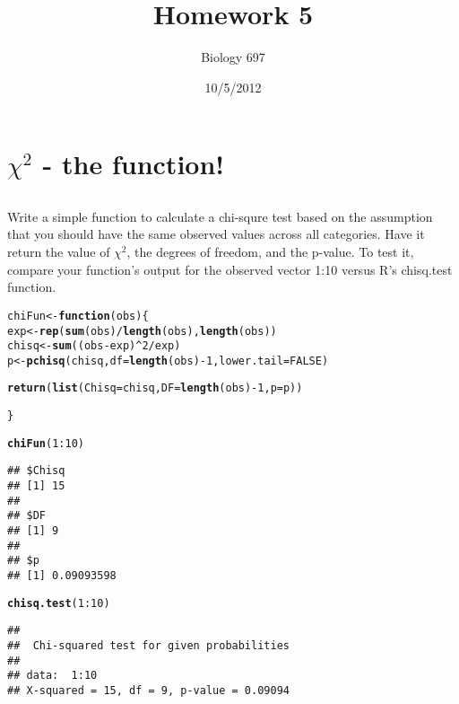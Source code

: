 \documentclass{article}\usepackage[]{graphicx}\usepackage[]{color}
\makeatletter
\newcommand{\hlnum}[1]{\textcolor[rgb]{0.686,0.059,0.569}{#1}}%
\newcommand{\hlopt}[1]{\textcolor[rgb]{0,0,0}{#1}}%
\newcommand{\hlstd}[1]{\textcolor[rgb]{0.345,0.345,0.345}{#1}}%
\newcommand{\hlkwa}[1]{\textcolor[rgb]{0.161,0.373,0.58}{\textbf{#1}}}%
\newcommand{\hlkwb}[1]{\textcolor[rgb]{0.69,0.353,0.396}{#1}}%
\newcommand{\hlkwc}[1]{\textcolor[rgb]{0.333,0.667,0.333}{#1}}%
\newcommand{\hlkwd}[1]{\textcolor[rgb]{0.737,0.353,0.396}{\textbf{#1}}}%
\newenvironment{kframe}{%
 \def\at@end@of@kframe{}%
 \ifinner\ifhmode%
  \def\at@end@of@kframe{\end{minipage}}%
  \begin{minipage}{\columnwidth}%
 \fi\fi%
 \def\FrameCommand##1{\hskip\@totalleftmargin \hskip-\fboxsep
 \colorbox{shadecolor}{##1}\hskip-\fboxsep
     \hskip-\linewidth \hskip-\@totalleftmargin \hskip\columnwidth}%
 \MakeFramed {\advance\hsize-\width
   \@totalleftmargin\z@ \linewidth\hsize
   \@setminipage}}%
 {\par\unskip\endMakeFramed%
 \at@end@of@kframe}
\newenvironment{knitrout}{}{} %
\makeatother
\begin{document}
\title{Homework 5} %
\author{Biology 697} %
\date{10/5/2012} %
\maketitle %



\section{$\chi^2$ - the function!}
\subsection{}
Write a simple function to calculate a chi-squre test based on the assumption that you should have the same observed values across all categories.  Have it return the value of $\chi^2$, the degrees of freedom, and the p-value.  To test it, compare your function's output for the observed vector 1:10 versus R's chisq.test function.
\begin{knitrout}
\color{fgcolor}\begin{kframe}
\begin{alltt}
\hlstd{chiFun}\hlkwb{<-}\hlkwa{function}\hlstd{(}\hlkwc{obs}\hlstd{)\{}
  \hlstd{exp} \hlkwb{<-} \hlkwd{rep}\hlstd{(}\hlkwd{sum}\hlstd{(obs)}\hlopt{/}\hlkwd{length}\hlstd{(obs),} \hlkwd{length}\hlstd{(obs))}
  \hlstd{chisq} \hlkwb{<-} \hlkwd{sum}\hlstd{((obs}\hlopt{-}\hlstd{exp)}\hlopt{^}\hlnum{2}\hlopt{/}\hlstd{exp)}
  \hlstd{p} \hlkwb{<-} \hlkwd{pchisq}\hlstd{(chisq,} \hlkwc{df}\hlstd{=}\hlkwd{length}\hlstd{(obs)}\hlopt{-}\hlnum{1}\hlstd{,} \hlkwc{lower.tail}\hlstd{=}\hlnum{FALSE}\hlstd{)}

  \hlkwd{return}\hlstd{(}\hlkwd{list}\hlstd{(}\hlkwc{Chisq} \hlstd{= chisq,} \hlkwc{DF} \hlstd{=} \hlkwd{length}\hlstd{(obs)}\hlopt{-}\hlnum{1}\hlstd{,} \hlkwc{p}\hlstd{=p))}

\hlstd{\}}

\hlkwd{chiFun}\hlstd{(}\hlnum{1}\hlopt{:}\hlnum{10}\hlstd{)}
\end{alltt}
\begin{verbatim}
## $Chisq
## [1] 15
## 
## $DF
## [1] 9
## 
## $p
## [1] 0.09093598
\end{verbatim}
\begin{alltt}
\hlkwd{chisq.test}\hlstd{(}\hlnum{1}\hlopt{:}\hlnum{10}\hlstd{)}
\end{alltt}
\begin{verbatim}
## 
## 	Chi-squared test for given probabilities
## 
## data:  1:10
## X-squared = 15, df = 9, p-value = 0.09094
\end{verbatim}
\end{kframe}
\end{knitrout}
\end{document}
